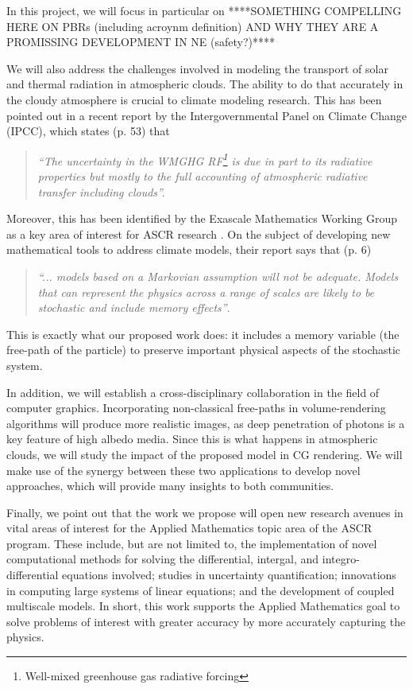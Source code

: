 \documentclass[12pt]{article}
\begin{document}
In this project, we will focus in particular on ****SOMETHING COMPELLING HERE ON PBRs (including acroynm definition) AND WHY THEY ARE A PROMISSING DEVELOPMENT IN NE (safety?)****

We will also address the challenges involved in modeling the transport of solar and thermal radiation in atmospheric clouds.
The ability to do that accurately in the cloudy atmosphere is crucial to climate modeling research.
This has been pointed out in a recent report\cite{ipcc13} by the Intergovernmental Panel on Climate Change (IPCC), which states (p. 53) that
\begin{quote}
\textit{``The uncertainty in the WMGHG RF\footnote{Well-mixed greenhouse gas radiative forcing} is due in part to its radiative properties but mostly to the full accounting of atmospheric radiative transfer including clouds''.}
\end{quote}

Moreover, this has been identified by the Exascale Mathematics Working Group as a key area of interest for ASCR research \cite{amrec14}.
On the subject of developing new mathematical tools to address climate models, their report says that (p. 6)
\begin{quote}
\textit{``... models based on a Markovian assumption will not be adequate.
Models that can represent the physics across a range of scales are likely to be stochastic and include memory effects''}.
\end{quote}
This is exactly what our proposed work does: it includes a memory variable (the free-path of the particle) to preserve important physical aspects of the stochastic system.

In addition, we will establish a cross-disciplinary collaboration in the field of computer graphics.
Incorporating non-classical free-paths in volume-rendering algorithms will produce more realistic images, as deep penetration of photons is a key feature of high albedo media.
Since this is what happens in atmospheric clouds, we will study the impact of the proposed model in CG rendering.
We will make use of the synergy between these two applications to develop novel approaches, which will provide many insights to both communities.

Finally, we point out that the work we propose will open new research avenues in vital areas of interest for the Applied Mathematics topic area of the ASCR program.
These include, but are not limited to, the implementation of novel computational methods for solving the differential, intergal, and integro-differential equations involved; studies in uncertainty quantification; innovations in computing large systems of linear equations; and the development of coupled multiscale models.
In short, this work supports the Applied Mathematics goal to solve problems of interest with greater accuracy by more accurately capturing the physics.
\end{document}
